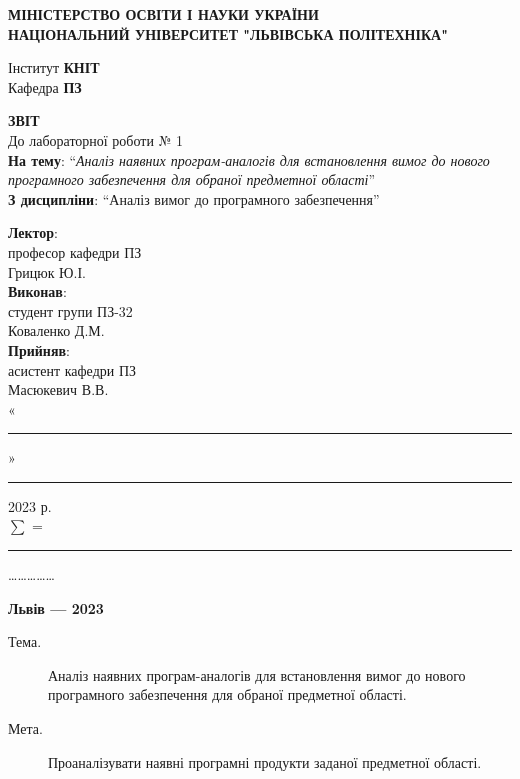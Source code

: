 \documentclass[14pt]{extreport}
\newcommand\subject{Аналіз вимог до програмного забезпечення}
\newcommand\lecturer{професор кафедри ПЗ\\Грицюк Ю.І.}
\newcommand\teacher{асистент кафедри ПЗ\\Масюкевич В.В.}
\newcommand\mygroup{ПЗ-32}
\newcommand\lab{1}
\newcommand\theme{Аналіз наявних програм-аналогів для встановлення вимог до нового програмного забезпечення для обраної предметної області}
\newcommand\purpose{Проаналізувати наявні програмні продукти заданої предметної
	області}
\begin{document}
\begin{normalsize}
	\begin{titlepage}
		\thispagestyle{empty}
		\begin{center}
			\textbf{МІНІСТЕРСТВО ОСВІТИ І НАУКИ УКРАЇНИ\\
				НАЦІОНАЛЬНИЙ УНІВЕРСИТЕТ "ЛЬВІВСЬКА ПОЛІТЕХНІКА"}
		\end{center}
		\begin{flushright}
			Інститут \textbf{КНІТ}\\
			Кафедра \textbf{ПЗ}
		\end{flushright}
		\vspace{200pt}
		\begin{center}
			\textbf{ЗВІТ}\\
			\vspace{10pt}
			До лабораторної роботи № \lab\\
			\textbf{На тему}: “\textit{\theme}”\\
			\textbf{З дисципліни}: “\subject”
		\end{center}
		\vspace{40pt}
		\begin{flushright}
			
			\textbf{Лектор}:\\
			\lecturer\\
			\vspace{10pt}
			\textbf{Виконав}:\\
			
			студент групи \mygroup\\
			Коваленко Д.М.\\
			\vspace{10pt}
			\textbf{Прийняв}:\\
			
			\teacher\\
			
			\vspace{28pt}
			«\rule{1cm}{0.15mm}» \rule{1.5cm}{0.15mm} 2023 р.\\
			$\sum$ = \rule{1cm}{0.15mm}……………\\
			
		\end{flushright}
		\vspace{\fill}
		\begin{center}
			\textbf{Львів — 2023}
		\end{center}
	\end{titlepage}
		
	\begin{description}
		\item[Тема.] \theme.
		\item[Мета.] \purpose.
	\end{description}


\end{normalsize}
\end{document}

